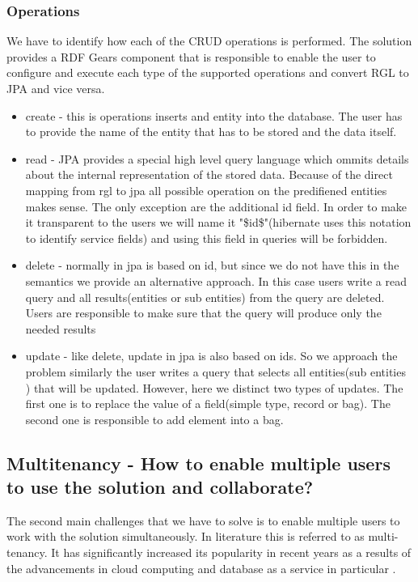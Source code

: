 \documentclass[a4paper, notitlepage]{article}
\begin{document}
\subsubsection{Operations}
We have to identify how each of the CRUD operations is performed. The solution provides a RDF Gears component that is responsible to enable the user to configure and execute each type of the supported operations and convert RGL to JPA and vice versa.
\begin{itemize}
	\item create - this is operations inserts and entity into the database. The user has to provide the name of the entity that has to be stored and the data itself.
	\item read - JPA provides a special high level query language which ommits details about the internal representation of the stored data. Because of the direct mapping from rgl to jpa all possible operation on the predifiened entities makes sense. The only exception are the additional id field. In order to make it transparent to the users we will name it "\$id\$"(hibernate uses this notation to identify service fields) and using this field in queries will be forbidden.
	\item delete - normally in jpa is based on id, but since we do not have this in the semantics we provide an alternative approach. In this case users write a read query and all results(entities or sub entities) from the query are deleted. Users are responsible to make sure that the query will produce only the needed results
	\item update - like delete, update in jpa is also based on ids. So we approach the problem similarly the user writes a query that selects all entities(sub entities ) that will be updated. However, here we distinct two types of updates. The first one is to replace the value of a field(simple type, record or bag). The second one is responsible to add element into a bag.
\end{itemize}

\subsection{Multitenancy - How to enable multiple users to use the solution and collaborate?}
The second main challenges that we have to solve is to enable multiple users to work with the solution simultaneously. In literature this is referred to as multi-tenancy. It has significantly increased its popularity in recent years as a results of the advancements in cloud computing and database as a service in particular \cite{Hui}. 
\end{document}
